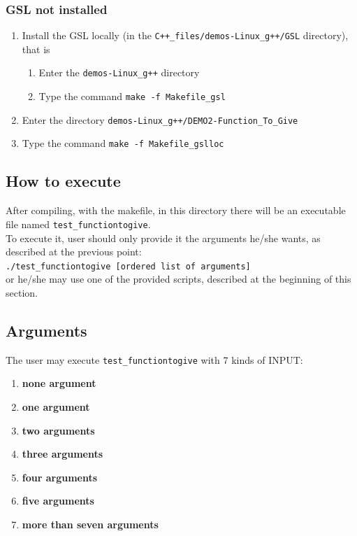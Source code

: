 \documentclass[10pt]{article}
\begin{document}
\subsubsection{GSL not installed}
\begin{enumerate}
 \item Install the GSL locally (in the {\tt C++\_files/demos-Linux\_g++/GSL} directory), that is
	  \begin{enumerate}
	  \item Enter the {\tt demos-Linux\_g++} directory
	  \item Type the command {\tt make -f Makefile\_gsl}
	  \end{enumerate}
 \item Enter the directory {\tt demos-Linux\_g++/DEMO2-Function\_To\_Give}
 \item Type the command {\tt make -f Makefile\_gslloc}
\end{enumerate}

\subsection{How to execute}
After compiling, with the makefile, in this directory there will be an executable file named {\tt test\_functiontogive}.\\
To execute it, user should only provide it the arguments he/she wants, as described at the previous point:\\

{\tt ./test\_functiontogive [ordered list of arguments]}\\

or he/she may use one of the provided scripts, described at the beginning of this section.


\subsection{Arguments}
The user may execute {\tt test\_functiontogive} with 7 kinds of INPUT:
\begin{enumerate}
\item \textbf{none argument}
 \item \textbf{one argument}
 \item \textbf{two arguments}
 \item \textbf{three arguments}
 \item \textbf{four arguments}
 \item \textbf{five arguments}
 \item \textbf{more than seven arguments}
\end{enumerate}
\end{document}
